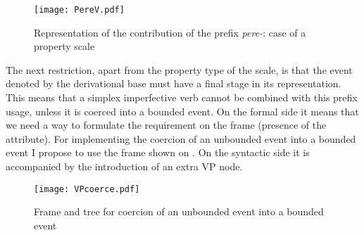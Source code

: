 \begin{figure}
\begin{minipage}{0.5\textwidth}
 \end{minipage}\hfill%
 \begin{minipage}{0.45\textwidth}
 \texttt{[image: PereV.pdf]}
 \end{minipage}
\caption{Representation of the contribution of the prefix \textit{pere-}: case of a property scale \label{frame:pere:iter}}
\end{figure}

The next restriction, apart from the property type of the scale, is that the event denoted by the derivational base must have a final stage in its representation. This means that a simplex imperfective verb cannot be combined with this prefix usage, unless it is coerced into a bounded event. On the formal side it means that we need a way to formulate the requirement on the frame (presence of the \FIN attribute). For implementing the coercion of an unbounded event into a bounded event I propose to use the frame shown on . On the syntactic side it is accompanied by the introduction of an extra VP node.

\begin{figure}
\hfill%
\hfill%
 \texttt{[image: VPcoerce.pdf]}\hfill
\caption{Frame and tree for coercion of an unbounded event into a bounded event \label{frame:coerce}}
\end{figure}

